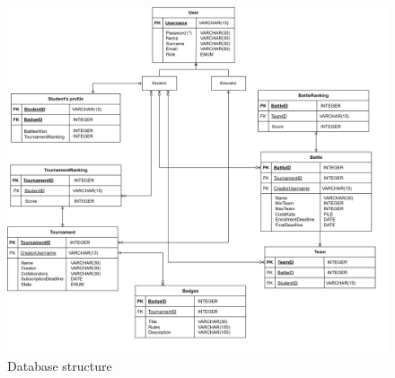 \begin{figure}[h]
    \centering 
    \includegraphics[width=\textwidth]{images/DB.png}
    \caption{Database structure}
    \label{fig:DB}
\end{figure}
